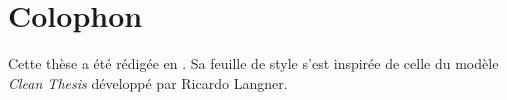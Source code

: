 %
\pagestyle{empty}
\hfill
\vfill
{}
\section*{Colophon}

Cette thèse a été rédigée en \LaTeXe.
Sa feuille de style s'est inspirée de celle du modèle \textit{Clean Thesis} développé par Ricardo Langner.